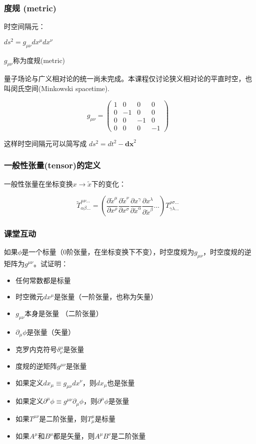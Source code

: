 \documentclass[CJK]{beamer}
\begin{document}
\begin{frame}
\frametitle{\bch 度规 (metric) \ech}
\bch 时空间隔元：\ech

$ds^2 = g_{\mu\nu} dx^\mu dx^\nu$

\bch $g_{\mu\nu}$称为度规(metric) \ech

{\vskip 0.1in}

\bch 量子场论与广义相对论的统一尚未完成。本课程仅讨论狭义相对论的平直时空，也叫闵氏空间(Minkowski spacetime). \ech

\begin{equation} 
g_{\mu\nu} =  \left( \begin{array}{rrrr} 1 & 0 & 0 & 0 \\ 0 & -1 & 0 & 0 \\ 0 & 0 & -1 & 0 \\ 0 & 0 & 0 & -1 \end{array} \right) \nonumber
\end{equation}

\bch 这样时空间隔元可以简写成 $ds^2 = dt^2 - \mathbf{dx}^2$ \ech

\end{frame}


\begin{frame}
\frametitle{\bch 一般性张量(tensor)的定义 \ech}
\bch
一般性张量在坐标变换$x \rightarrow \tilde{x}$下的变化：
\ech

$$\tilde{T}^{\mu\nu\ldots}_{\alpha\beta\ldots} = \left(\frac{\partial \tilde{x}^\mu}{\partial x^\rho}\frac{\partial \tilde{x}^\nu}{\partial x^\sigma} \frac{\partial x^\gamma }{\partial \tilde{x}^\alpha}\frac{\partial x^\lambda}{\partial \tilde{x}^\beta} \ldots \right)T^{\rho\sigma\ldots}_{\gamma\lambda\ldots} $$

\end{frame}

\begin{frame}
\frametitle{\bch 课堂互动 \ech}
\bch
如果$\phi$是一个标量（0阶张量，在坐标变换下不变），时空度规为$g_{\mu\nu}$，时空度规的逆矩阵为$g^{\mu\nu}$。试证明：
\begin{itemize}
\item{任何常数都是标量}
\item{时空微元$dx^\mu$是张量（一阶张量，也称为矢量）}
\item{$g_{\mu\nu}$本身是张量 （二阶张量）}
\item{$\partial_\mu\phi$是张量（矢量）}
\item{克罗内克符号$\delta^{\mu}_{\nu}$是张量}
\item{度规的逆矩阵$g^{\mu\nu}$是张量}
\item{如果定义$dx_{\mu} \equiv g_{\mu\nu} dx^{\nu}$，则$dx_\mu$也是张量}
\item{如果定义$\partial^\mu\phi \equiv g^{\mu\nu}\partial_\mu\phi$，则$\partial^\mu\phi$是张量}
\item{如果$T^{\mu\nu}$是二阶张量，则$T^{\mu}_{\mu}$是标量}
\item{如果$A^{\mu}$和$B^{\mu}$都是矢量，则$A^\mu B^\nu$是二阶张量}
\end{itemize}
\ech
\end{frame}
\end{document}
